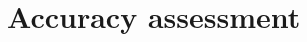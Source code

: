 
\lhead[\fancyplain{}{\leftmark}]%
      {\fancyplain{}{}} %
\chead[\fancyplain{}{}]%
      {\fancyplain{}{}}
\rhead[\fancyplain{}{}]%
      {\fancyplain{}{\rightmark}}%
\lfoot[\fancyplain{}{}]%
      {\fancyplain{}{}}
\cfoot[\fancyplain{}{\thepage}]%
      {\fancyplain{}{\thepage}} %
\rfoot[\fancyplain{}{}]%
     {\fancyplain{}{\scriptsize}}



\chapter{Accuracy assessment}
\label{ch:5}


